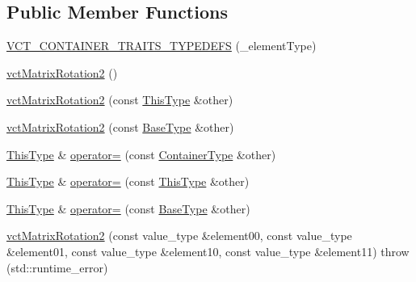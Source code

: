 \subsection*{Public Member Functions}
\begin{DoxyCompactItemize}
\item 
\hyperlink{classvct_matrix_rotation2_a30120b34e9e60e504a0ada920b094b2b}{V\+C\+T\+\_\+\+C\+O\+N\+T\+A\+I\+N\+E\+R\+\_\+\+T\+R\+A\+I\+T\+S\+\_\+\+T\+Y\+P\+E\+D\+E\+F\+S} (\+\_\+element\+Type)
\item 
\hyperlink{classvct_matrix_rotation2_a907508e3326a81a41235ce8bf3c805da}{vct\+Matrix\+Rotation2} ()
\item 
\hyperlink{classvct_matrix_rotation2_a95e5e339925fbda7fe04b1240f0d3f98}{vct\+Matrix\+Rotation2} (const \hyperlink{classvct_fixed_size_const_matrix_base_a7ec66a96ed7e08ce9ff54093133c9d8d}{This\+Type} \&other)
\item 
\hyperlink{classvct_matrix_rotation2_a6d34c2bbd96fd9177d52eea69a52c0d6}{vct\+Matrix\+Rotation2} (const \hyperlink{classvct_matrix_rotation2_a6d9fad3de3e445606a22bf1a3e9da631}{Base\+Type} \&other)
\item 
\hyperlink{classvct_fixed_size_const_matrix_base_a7ec66a96ed7e08ce9ff54093133c9d8d}{This\+Type} \& \hyperlink{classvct_matrix_rotation2_ad60f8a82d28ff8065c60efe2b51e9848}{operator=} (const \hyperlink{classvct_matrix_rotation2_ab84e040499a56ef9c8ab6b3a57e09479}{Container\+Type} \&other)
\item 
\hyperlink{classvct_fixed_size_const_matrix_base_a7ec66a96ed7e08ce9ff54093133c9d8d}{This\+Type} \& \hyperlink{classvct_matrix_rotation2_a7389636970e3a7abaa1b51c74da2374d}{operator=} (const \hyperlink{classvct_fixed_size_const_matrix_base_a7ec66a96ed7e08ce9ff54093133c9d8d}{This\+Type} \&other)
\item 
\hyperlink{classvct_fixed_size_const_matrix_base_a7ec66a96ed7e08ce9ff54093133c9d8d}{This\+Type} \& \hyperlink{classvct_matrix_rotation2_aef85a096b2028bc5fc6c61fe564013a2}{operator=} (const \hyperlink{classvct_matrix_rotation2_a6d9fad3de3e445606a22bf1a3e9da631}{Base\+Type} \&other)
\item 
\hyperlink{classvct_matrix_rotation2_a1443f4417658764277b5cd9deb0615d3}{vct\+Matrix\+Rotation2} (const value\+\_\+type \&element00, const value\+\_\+type \&element01, const value\+\_\+type \&element10, const value\+\_\+type \&element11)  throw (std\+::runtime\+\_\+error)
\item 

\end{DoxyCompactItemize}
